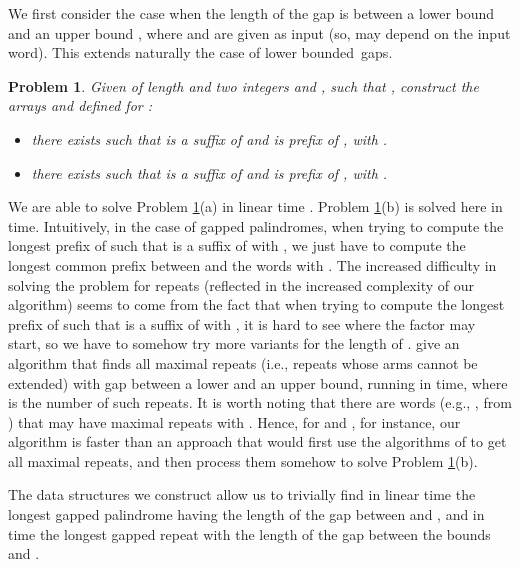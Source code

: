 \documentclass[final]{dmtcs-episciences}
\newtheorem{problem}{Problem}
\begin{document}
We first consider the case when the length of the gap is between a lower bound  and an upper bound , where  and  are given as input (so, may depend on the input word). This extends naturally the case of lower bounded~gaps. 
\begin{problem}\label{LPFgG}
Given  of length  and two integers  and , such that , construct the arrays  and  defined for :
\begin{itemize} 
\item[a.]  there exists  such that  is a suffix of  and  is prefix of , with .
\item[b.] there exists  such that  is a suffix of  and  is prefix of , with .
\end{itemize}
\end{problem}
We are able to solve Problem \ref{LPFgG}(a) in linear time . Problem \ref{LPFgG}(b)  is solved here in  time. Intuitively, in the case of gapped palindromes, when trying to compute the longest prefix  of  such that  is a suffix of  with , we just have to compute the longest common prefix between  and the words  with . The increased difficulty in solving the problem for repeats (reflected in the increased complexity of our algorithm) seems to come from the fact that when trying to compute the longest prefix  of  such that  is a suffix of  with , it is hard to see where the  factor may start, so we have to somehow try more variants for the length of . \cite{Brodal} give an algorithm that finds all maximal repeats (i.e., repeats whose arms cannot be extended) with gap between a lower and an upper bound, running in  time, where  is the number of such repeats. It is worth noting that there are words (e.g., , from \cite{Brodal}) that may have  maximal repeats  with . Hence, for  and , for instance, our algorithm is faster than an approach that would first use the algorithms of \cite{Brodal} to get all maximal repeats, and then process them somehow to solve Problem \ref{LPFgG}(b). 

The data structures we construct allow us to trivially find in linear time the longest gapped palindrome having the length of the gap between  and , and in  time the longest gapped repeat with the length of the gap between the bounds  and .  
\end{document}
